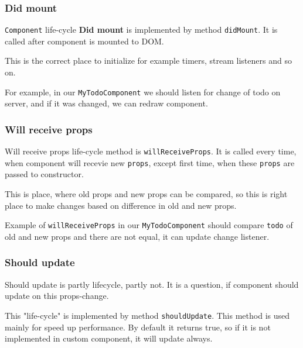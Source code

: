     \subsubsection{Did mount}\label{subsec:our-architecture-lifecycle-didmount}

      \texttt{Component} life-cycle \textbf{Did mount} is implemented by method \texttt{didMount}. 
      It is called after component is mounted to DOM. 

      This is the correct place to initialize for example timers, stream listeners and so on. 

      For example, in our \texttt{MyTodoComponent} we should listen for change of todo on server, 
      and if it was changed, we can redraw component.
      

    \subsubsection{Will receive props}\label{subsec:our-architecture-lifecycle-willreceiveprops}

      Will receive props life-cycle method is \texttt{willReceiveProps}. 
      It is called every time, when component will recevie new \texttt{props}, 
      except first time, when these \texttt{props} are passed to constructor.

      This is place, where old props and new props can be compared, 
      so this is right place to make changes based on difference in old and new props.

      Example of \texttt{willReceiveProps} in our \texttt{MyTodoComponent} 
      should compare \texttt{todo} of old and new props and there are not equal, 
      it can update change listener.
      
      
      
    \subsubsection{Should update}\label{subsec:our-architecture-lifecycle-shouldupdate}
      Should update is partly lifecycle, partly not. 
      It is a question, if component should update on  this props-change. 

      This "life-cycle" is implemented by method \texttt{shouldUpdate}. 
      This method is used mainly for speed up performance. 
      By default it returns true, 
      so if it is not implemented in custom component, 
      it will update always.

